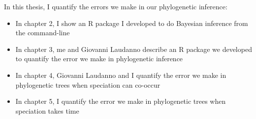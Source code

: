 In this thesis, I quantify the errors we make in our phylogenetic inference:

\begin{itemize}
	\item In chapter 2, I show an R package I developed to do Bayesian
    inference from the command-line
	\item In chapter 3, me and Giovanni Laudanno describe an R package we 
    developed to quantify the error we make in phylogenetic inference
	\item In chapter 4, Giovanni Laudanno and I quantify the error we make 
    in phylogenetic trees when speciation can co-occur
	\item In chapter 5, I quantify the error we make 
    in phylogenetic trees when speciation takes time
\end{itemize}


